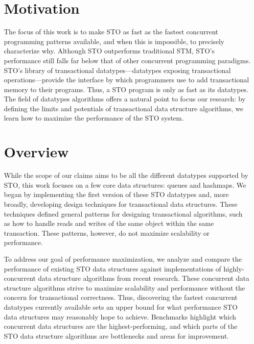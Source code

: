 \section{Motivation}
The focus of this work is to make STO as fast as the fastest concurrent programming patterns available, and when this is impossible, to precisely characterize why. Although STO outperforms traditional STM, STO’s performance still falls far below that of other concurrent programming paradigms. STO’s library of transactional datatypes---datatypes exposing transactional operations---provide the interface by which programmers use to add transactional memory to their programs. Thus, a STO program is only as fast as its datatypes. The field of datatypes algorithms offers a natural point to focus our research: by defining the limits and potentials of transactional data structure algorithms, we learn how to maximize the performance of the STO system.

\section{Overview}
While the scope of our claims aims to be all the different datatypes supported by STO, this work focuses on a few core data structures: queues and hashmaps. We began by implementing the first version of these STO datatypes and, more broadly, developing design techniques for transactional data structures. These techniques defined general patterns for designing transactional algorithms, such as how to handle reads and writes of the same object within the same transaction. These patterns, however, do not maximize scalability or performance.

To address our goal of performance maximization, we analyze and compare the performance of existing STO data structures against implementations of highly-concurrent data structure algorithms from recent research. These concurrent data structure algorithms strive to maximize scalability and performance without the concern for transactional correctness. Thus, discovering the fastest concurrent datatypes currently available sets an upper bound for what performance STO data structures may reasonably hope to achieve. Benchmarks highlight which concurrent data structures are the highest-performing, and which parts of the STO data structure algorithms are bottlenecks and areas for improvement. 

